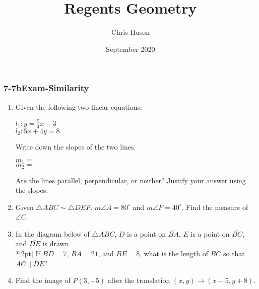 \documentclass[12pt, twoside]{article}
\title{Regents Geometry}
\author{Chris Huson}
\date{September 2020}
\begin{document}
\subsubsection*{7-7bExam-Similarity}
\begin{enumerate}
\item Given the following two linear equations:
  \begin{multicols}{2}
    $l_1: y =\frac{5}{4}x-3$ \\
    $l_2: 5x+4y=8$
  \end{multicols}     \vspace{1cm}
  Write down the slopes of the two lines.
  \begin{multicols}{2}
    $m_1=$ \\
    $m_2=$
  \end{multicols}     \vspace{0.1cm}
  Are the lines parallel, perpendicular, or neither? Justify your answer using the slopes.
  \vspace{2cm}

\item Given $\triangle ABC \sim \triangle DEF$. $m\angle A = 80^\circ$ and $m\angle F = 40^\circ$. Find the measure of $\angle C$. \vspace{2cm}
  
\item In the diagram below of $\triangle ABC$, $D$ is a point on $\overline{BA}$, $E$ is a point on $\overline{BC}$, and $\overline{DE}$ is drawn. \\*[2pt] 
  If $BD=7$, $BA=21$, and $BE=8$, what is the length of $\overline{BC}$ so that $\overline{AC} \parallel \overline{DE}$?
  \begin{flushright}
    \end{flushright}

\item Find the image of $P(3,-5)$ after the translation $(x,y) \rightarrow (x-5,y+8)$.
  

\end{enumerate}
\end{document}
